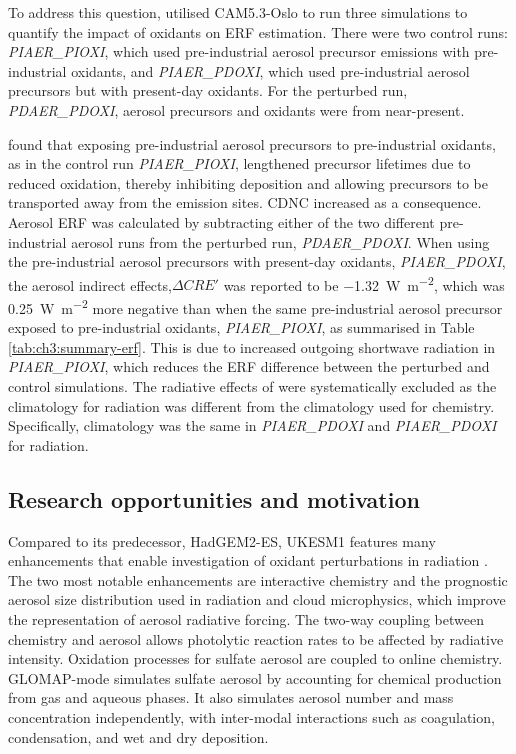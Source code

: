 To address this question, \citet{karsetStrongImpactsAerosol2018} utilised CAM5.3-Oslo \citep{kirkevagProductiontaggedAerosolModule2018} to run three simulations to quantify the impact of oxidants on ERF estimation. There were two control runs: \textit{PIAER\_PIOXI}, which used pre-industrial aerosol precursor emissions with pre-industrial oxidants, and \textit{PIAER\_PDOXI}, which used pre-industrial aerosol precursors but with present-day oxidants. For the perturbed run, \textit{PDAER\_PDOXI}, aerosol precursors and oxidants were from near-present. 

\citet{karsetStrongImpactsAerosol2018} found that exposing pre-industrial aerosol precursors to pre-industrial oxidants, as in the control run \textit{PIAER\_PIOXI}, lengthened precursor lifetimes due to reduced oxidation, thereby inhibiting deposition and allowing precursors to be transported away from the emission sites. CDNC increased as a consequence. Aerosol ERF was calculated by subtracting either of the two different pre-industrial aerosol runs from the perturbed run, \textit{PDAER\_PDOXI}. When using the pre-industrial aerosol precursors with present-day oxidants, \textit{PIAER\_PDOXI}, the aerosol indirect effects,$\Delta CRE'$ was reported to be \qty{-1.32}{\watt\per\metre\squared}, which was \qty{0.25}{\watt\per\metre\squared} more negative than when the same pre-industrial aerosol precursor exposed to pre-industrial oxidants, \textit{PIAER\_PIOXI}, as summarised in Table \ref{tab:ch3:summary-erf}. This is due to increased outgoing shortwave radiation in \textit{PIAER\_PIOXI}, which reduces the ERF difference between the perturbed and control simulations. The radiative effects of  were systematically excluded as the  climatology for radiation was different from the  climatology used for chemistry. Specifically,  climatology was the same in \textit{PIAER\_PDOXI} and \textit{PIAER\_PDOXI} for radiation. 

\subsection{Research opportunities and motivation}

Compared to its predecessor, HadGEM2-ES, UKESM1 features many enhancements that enable investigation of oxidant perturbations in radiation \citep{sellarUKESM1DescriptionEvaluation2019}. The two most notable enhancements are interactive chemistry and the prognostic aerosol size distribution used in radiation and cloud microphysics, which improve the representation of aerosol radiative forcing. The two-way coupling between chemistry and aerosol allows photolytic reaction rates to be affected by radiative intensity. Oxidation processes for sulfate aerosol are coupled to online chemistry. GLOMAP-mode simulates sulfate aerosol by accounting for chemical production from gas and aqueous phases. It also simulates aerosol number and mass concentration independently, with inter-modal interactions such as coagulation, condensation, and wet and dry deposition. 

